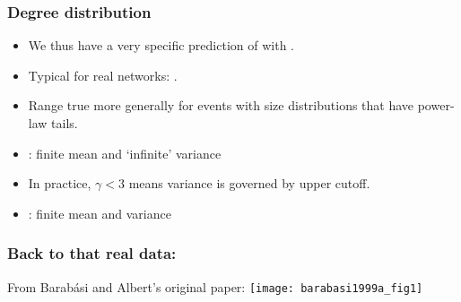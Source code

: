 
\begin{frame}[label=]
 \frametitle{Degree distribution}

 \begin{block}{}
 \begin{itemize}
  \item<1-> 
    We thus have a very specific prediction of 
     with .
  \item<2-> 
    Typical for real networks: .
  \item<3-> 
    Range true more generally for events with size
    distributions that have power-law tails.
  \item<4->
    : finite mean and `infinite' variance
  \item<5->
    In practice, $\gamma < 3$ means variance is governed
    by upper cutoff.
  \item<6->
    : finite mean and variance 
 \end{itemize}
 \end{block}

\end{frame}


\begin{frame}[label=]
 \frametitle{Back to that real data:}

 \begin{block}{From Barab\'{a}si and Albert's original paper\cite{barabasi1999a}:}
   \texttt{[image: barabasi1999a\_fig1]}   
 \end{block}
 
\end{frame}

